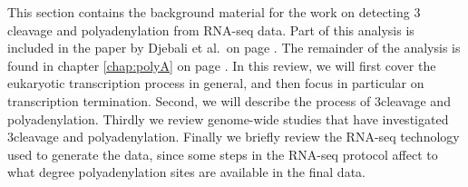 %
This section contains the background material for the work on detecting 3\ppp
cleavage and polyadenylation from RNA-seq data. Part of this analysis is
included in the paper by Djebali et al.\ on page \pageref{landscape}. The
remainder of the analysis is found in chapter \ref{chap:polyA} on page
\pageref{chap:polyA}. In this review, we will first cover the eukaryotic
transcription process in general, and then focus in particular on transcription
termination. Second, we will describe the process of 3\ppp cleavage and
polyadenylation. Thirdly we review genome-wide studies that have investigated
3\ppp cleavage and polyadenylation. Finally we briefly review the RNA-seq
technology used to generate the data, since some steps in the RNA-seq protocol
affect to what degree polyadenylation sites are available in the final data.
